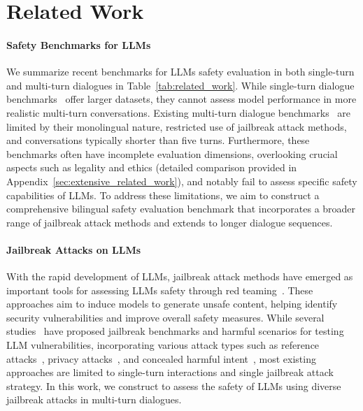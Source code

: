 \section{Related Work}
\paragraph{Safety Benchmarks for LLMs}
We summarize recent benchmarks for LLMs safety evaluation in both single-turn and multi-turn dialogues in Table~\ref{tab:related_work}. While single-turn dialogue benchmarks~\cite{zhang2023safetybench,ji2024beavertails,li2024salad,deng2022cold} offer larger datasets, they cannot assess model performance in more realistic multi-turn conversations. Existing multi-turn dialogue benchmarks~\cite{agarwal2024prompt,yu2024cosafe,jiang2024red,xu2023sc} are limited by their monolingual nature, restricted use of jailbreak attack methods, and conversations typically shorter than five turns. Furthermore, these benchmarks often have incomplete evaluation dimensions, overlooking crucial aspects such as legality and ethics (detailed comparison provided in Appendix~\ref{sec:extensive_related_work}), and notably fail to assess specific safety capabilities of LLMs. 
To address these limitations, we aim to construct a comprehensive bilingual safety evaluation benchmark that incorporates a broader range of jailbreak attack methods and extends to longer dialogue sequences.

\paragraph{Jailbreak Attacks on LLMs}
With the rapid development of LLMs, jailbreak attack methods have emerged as important tools for assessing LLMs safety through red teaming~\cite{lin2024against,perez2022red,wei2024jailbroken,liu2023jailbreaking,xu2024comprehensive,xu2024llm}. These approaches aim to induce models to generate unsafe content, helping identify security vulnerabilities and improve overall safety measures.
While several studies~\cite{ji2024beavertails,li2024salad} have proposed jailbreak benchmarks and harmful scenarios for testing LLM vulnerabilities, incorporating various attack types such as reference attacks~\cite{yu2024cosafe}, privacy attacks~\cite{huang2022large,mireshghallahcan}, and concealed harmful intent~\cite{jiang2024red}, most existing approaches are limited to single-turn interactions and single jailbreak attack strategy. In this work, we construct \benchmark to assess the safety of LLMs using diverse jailbreak attacks in multi-turn dialogues.